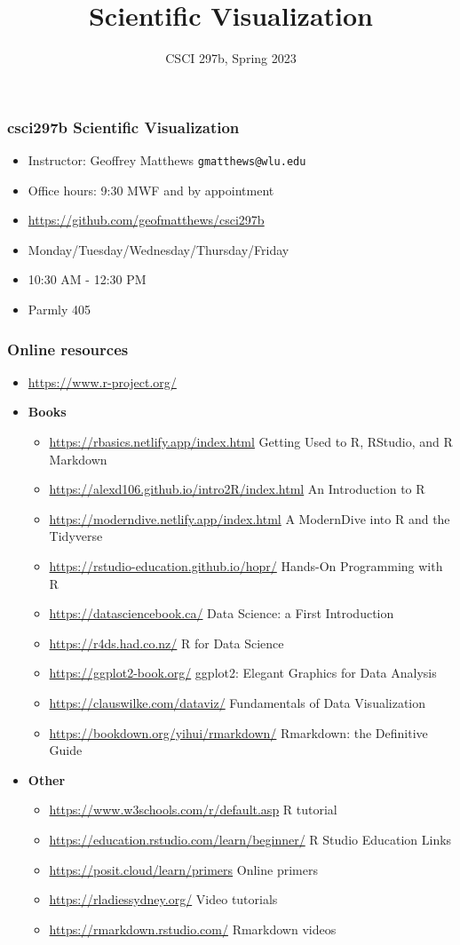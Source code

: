 \documentclass{beamer}
\title{Scientific Visualization}
\author{CSCI 297b, Spring 2023}
\newcommand{\bi}{\begin{itemize}}
\newcommand{\li}{\item}
\newcommand{\ei}{\end{itemize}}
\newcommand{\bfr}[1]{\begin{frame}[fragile]\frametitle{{ #1 }}}
\begin{document}
\begin{frame}
\maketitle
\end{frame}

\bfr{csci297b Scientific Visualization}
\bi
\li Instructor:  Geoffrey Matthews \verb|gmatthews@wlu.edu|
\li Office hours:  9:30 MWF and by appointment
\li \url{https://github.com/geofmatthews/csci297b}
\li
Monday/Tuesday/Wednesday/Thursday/Friday
\li 10:30 AM - 12:30 PM
\li
Parmly 405
\ei
\end{frame}

\bfr{Online resources}

\bi\scriptsize
\li \url{https://www.r-project.org/}
\li
{\bf Books}
\bi\tiny
\li
\url{https://rbasics.netlify.app/index.html}
\dotfill
Getting Used to R, RStudio, and R Markdown

\li
\url{https://alexd106.github.io/intro2R/index.html}
\dotfill
An Introduction to R

\li
\url{https://moderndive.netlify.app/index.html}
\dotfill
A ModernDive into R and the Tidyverse

\li
\url{https://rstudio-education.github.io/hopr/}
\dotfill
Hands-On Programming with R

\li
\url{https://datasciencebook.ca/}
\dotfill
Data Science: a First Introduction

\li
\url{https://r4ds.had.co.nz/}
\dotfill
R for Data Science

\li
\url{https://ggplot2-book.org/}
\dotfill
ggplot2: Elegant Graphics for Data Analysis

\li
\url{https://clauswilke.com/dataviz/}
\dotfill
Fundamentals of Data Visualization


\li
\url{https://bookdown.org/yihui/rmarkdown/}
\dotfill
Rmarkdown: the Definitive Guide

\ei

\li
 {\bf Other}

\bi\tiny
\li
\url{https://www.w3schools.com/r/default.asp}
R tutorial

\li
\url{https://education.rstudio.com/learn/beginner/}
\dotfill
R Studio Education Links
\li
\url{https://posit.cloud/learn/primers}
\dotfill
Online primers

\li
\url{https://rladiessydney.org/}
\dotfill
Video tutorials

\li
\url{https://rmarkdown.rstudio.com/}
\dotfill
Rmarkdown videos

\ei
\ei
\end{frame}
\end{document}
